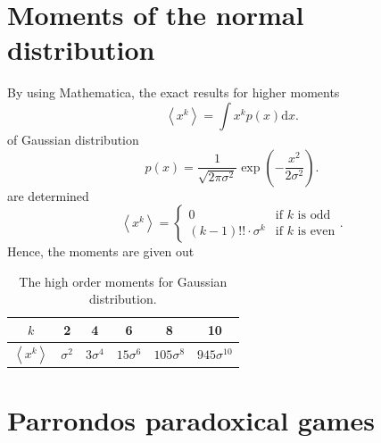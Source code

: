 \documentclass[paper=a4, fontsize=11pt]{scrartcl} %
\numberwithin{equation}{section} %
\numberwithin{figure}{section} %
\numberwithin{table}{section} %
\begin{document}

\section{Moments of the normal distribution}

By using Mathematica, the exact results for higher moments
\begin{equation*}
	\left<x^k\right>=\int x^kp\left( x \right)\mathrm{d}x.
\end{equation*}
of Gaussian distribution
\begin{equation*}
	p\left( x \right)=\frac{1}{\sqrt{2\pi\sigma^2}}\exp\left( -\frac{x^2}{2\sigma^2} \right).
\end{equation*}
are determined
\begin{equation*}
	\left<x^k\right>=\begin{cases}0&\text{if \(k\) is odd}\\\left(k-1\right)!!\cdot\sigma^{k}&\text{if \(k\) is even}\end{cases}.
\end{equation*}
Hence, the moments are given out
\begin{table}[!ht]
	\centering
	\caption{The high order moments for Gaussian distribution.}
	\label{tab:moments}
	\begin{tabular}{cccccc}
		\toprule
		\(k\) & 2 & 4 & 6 & 8 & 10 \\
		\midrule
		\(\left<x^k\right>\) & \(\sigma^2\) & \(3\sigma^4\) & \(15\sigma^6\) & \(105\sigma^8\) & \(945\sigma^{10}\)\\
		\bottomrule
	\end{tabular}
\end{table}\par


\section{Parrondos paradoxical games}
\end{document}
